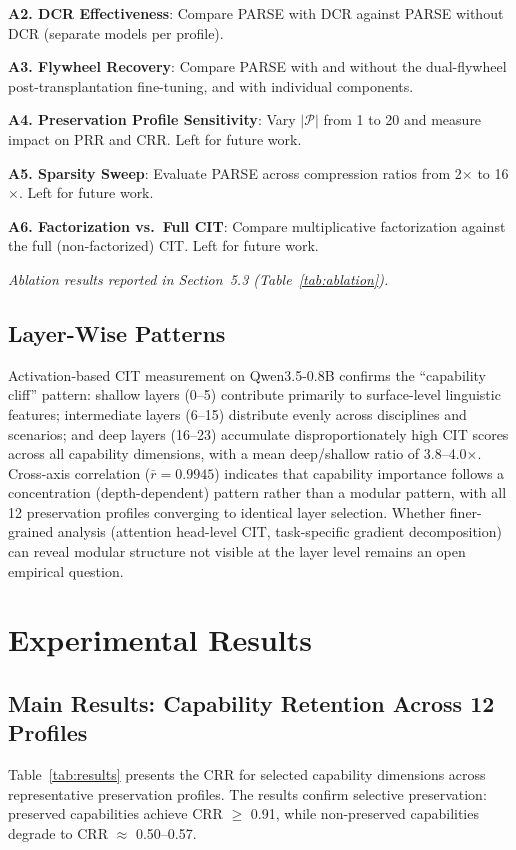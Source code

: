 \documentclass[twocolumn]{article}
\begin{document}
\textbf{A2. DCR Effectiveness}: Compare PARSE with DCR against PARSE without DCR (separate models per profile).

\textbf{A3. Flywheel Recovery}: Compare PARSE with and without the dual-flywheel post-transplantation fine-tuning, and with individual components.

\textbf{A4. Preservation Profile Sensitivity}: Vary $|\mathcal{P}|$ from 1 to 20 and measure impact on PRR and CRR. Left for future work.

\textbf{A5. Sparsity Sweep}: Evaluate PARSE across compression ratios from 2$\times$ to 16$\times$. Left for future work.

\textbf{A6. Factorization vs.\ Full CIT}: Compare multiplicative factorization against the full (non-factorized) CIT. Left for future work.

\textit{Ablation results reported in Section~5.3 (Table~\ref{tab:ablation}).}

\subsection{Layer-Wise Patterns}

Activation-based CIT measurement on Qwen3.5-0.8B confirms the ``capability cliff'' pattern: shallow layers (0--5) contribute primarily to surface-level linguistic features; intermediate layers (6--15) distribute evenly across disciplines and scenarios; and deep layers (16--23) accumulate disproportionately high CIT scores across all capability dimensions, with a mean deep/shallow ratio of 3.8--4.0$\times$.
Cross-axis correlation ($\bar{r} = 0.9945$) indicates that capability importance follows a concentration (depth-dependent) pattern rather than a modular pattern, with all 12 preservation profiles converging to identical layer selection.
Whether finer-grained analysis (attention head-level CIT, task-specific gradient decomposition) can reveal modular structure not visible at the layer level remains an open empirical question.

\section{Experimental Results}

\subsection{Main Results: Capability Retention Across 12 Profiles}

Table~\ref{tab:results} presents the CRR for selected capability dimensions across representative preservation profiles. The results confirm selective preservation: preserved capabilities achieve CRR $\geq$ 0.91, while non-preserved capabilities degrade to CRR $\approx$ 0.50--0.57.
\end{document}

